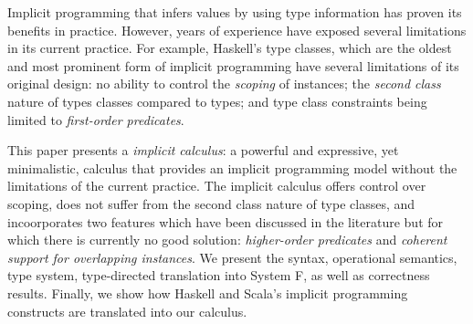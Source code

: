 Implicit programming that infers values by using type
information has proven its benefits in practice. However, 
years of experience have exposed several limitations in its current practice.
For example, Haskell's type classes, which are the oldest and most
prominent form of implicit programming have several
limitations of its original design: no
ability to control the \emph{scoping} of instances; the \emph{second
  class} nature of types classes compared to types; and type class
constraints being limited to \emph{first-order predicates}.

This paper presents a \textit{implicit calculus}: a powerful and expressive,
yet minimalistic, calculus that provides an implicit programming model
without the limitations of the current practice. The implicit calculus
offers control over scoping, does not suffer from the second class
nature of type classes, and incoorporates two features which
have been discussed in the literature but for which there is
currently no good solution: \emph{higher-order predicates} and
\emph{coherent support for overlapping instances}.  We present the
syntax, operational semantics, type system, type-directed translation
into System F, as well as correctness results. Finally, we show how
Haskell and Scala's implicit programming constructs are translated
into our calculus.

